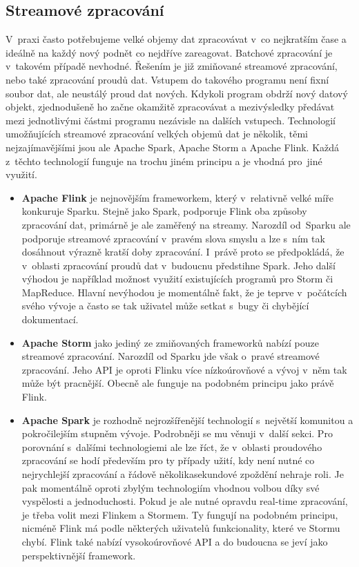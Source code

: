 \documentclass[thesis=B,czech]{FITthesis}[2012/06/26]
\begin{document}
\subsection{Streamové zpracování}
	V~praxi často potřebujeme velké objemy dat zpracovávat v~co nejkratším čase a ideálně na každý nový podnět co nejdříve zareagovat. Batchové zpracování je v~takovém případě nevhodné. Řešením je již zmiňované streamové zpracování, nebo také zpracování proudů dat. Vstupem do takového programu není fixní soubor dat, ale neustálý proud dat nových. Kdykoli program obdrží nový datový objekt, zjednodušeně ho začne okamžitě zpracovávat a mezivýsledky předávat mezi jednotlivými částmi programu nezávisle na dalších vstupech. Technologií umožňujících streamové zpracování velkých objemů dat je několik, těmi nejzajímavějšími jsou ale Apache Spark, Apache Storm a Apache Flink. Každá z~těchto technologií funguje na trochu jiném principu a je vhodná pro~jiné využití. 
	
\begin{itemize}
\item \textbf{Apache Flink} je nejnovějším frameworkem, který v~relativně velké míře konkuruje Sparku. Stejně jako Spark, podporuje Flink oba způsoby zpracování dat, primárně je ale zaměřený na streamy. Narozdíl od~Sparku ale podporuje streamové zpracování v~pravém slova smyslu a lze s~ním tak dosáhnout výrazně kratší doby zpracování\cite{streaming-benchmark}. I~právě proto se předpokládá, že v~oblasti zpracování proudů dat v~budoucnu předstihne Spark\cite{flink-future}. Jeho další výhodou je například možnost využití existujících programů pro Storm či MapReduce. Hlavní nevýhodou je momentálně fakt, že je teprve v~počátcích svého vývoje a často se tak uživatel může setkat s~bugy či chybějící dokumentací. 
	
\item \textbf{Apache Storm} jako jediný ze zmiňovaných frameworků nabízí pouze streamové zpracování. Narozdíl od Sparku jde však o~pravé streamové zpracování. Jeho API je oproti Flinku více nízkoúrovňové a vývoj v~něm tak může být pracnější. Obecně ale funguje na podobném principu jako právě Flink. 
	
\item \textbf{Apache Spark} je rozhodně nejrozšířenější technologií s~největší komunitou a pokročilejším stupněm vývoje. Podrobněji se mu věnuji v~další sekci. Pro porovnání s~dalšími technologiemi ale lze říct, že v~oblasti proudového zpracování se hodí především pro ty případy užití, kdy není nutné co nejrychlejší zpracování a řádově několikasekundové zpoždění nehraje roli. Je pak momentálně oproti zbylým technologiím vhodnou volbou díky své vyspělosti a jednoduchosti. Pokud je ale nutné opravdu real-time zpracování, je třeba volit mezi Flinkem a Stormem. Ty fungují na podobném principu, nicméně Flink má podle některých uživatelů funkcionality, které ve Stormu chybí\cite{so-flink-storm}. Flink také nabízí vysokoúrovňové API a do budoucna se jeví jako perspektivnější framework. 
\end{itemize}		
	
\end{document}
